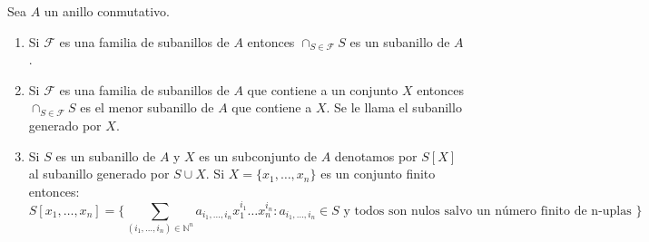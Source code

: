 \begin{proposition}
Sea $A$ un anillo conmutativo. 

\begin{enumerate}
\item Si $\mathcal{F}$ es una familia de subanillos de $A$ entonces $\cap_{S \in \mathcal{F}} S$ es un subanillo de $A$. 
\item Si $\mathcal{F}$ es una familia de subanillos de $A$ que contiene a un conjunto $X$ entonces $\cap_{S \in \mathcal{F}} S$ es el menor subanillo de $A$ que contiene a $X$. Se le llama el subanillo generado por $X$. 
\item Si $S$ es un subanillo de $A$ y $X$ es un subconjunto de $A$ denotamos por $S[X]$ al subanillo generado por $S \cup X$. Si $X = \{x_1,\ldots,x_n \}$ es un conjunto finito entonces: $$S[x_1,\ldots,x_n] = \{\sum_{(i_1,\ldots,i_n) \in \mathbb{N}^n} a_{i_1,\ldots,i_n} x_1^{i_1} \ldots x_n^{i_n}: a_{i_1,\ldots,i_n} \in S \text{ y todos son nulos salvo un número finito de n-uplas } \}$$
\end{enumerate}

\end{proposition}
